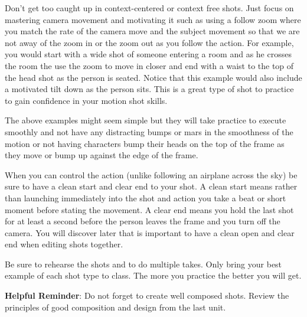 \documentclass[
]{book}
\begin{document}
\begin{assessment}
Don't get too caught up in context-centered or context free shots. Just focus on mastering camera movement and motivating it such as using a follow zoom where
you match the rate of the camera move and the subject movement so that we are not away of the zoom in or the zoom out as you follow the action. For example, you would start with a wide shot of someone entering a room and as he crosses the room the use the zoom to move in closer and end with a waist to the top of the head shot as the person is seated. Notice that this example would also
include a motivated tilt down as the person sits. This is a great type of shot to practice to gain confidence in your motion shot skills.

The above examples might seem simple but they will take practice to execute smoothly and not have any distracting bumps or mars in the smoothness of the motion or not having characters bump their heads on the top of the frame as they move or bump up against the edge of the frame.

When you can control the action (unlike following an airplane across the sky) be sure to have a clean start and clear end to your shot. A clean start means
rather than launching immediately into the shot and action you take a beat or short moment before stating the movement. A clear end means you hold the last
shot for at least a second before the person leaves the frame and you turn off the camera. You will discover later that is important to have a clean open and clear end when editing shots together.

Be sure to rehearse the shots and to do multiple takes. Only bring your best example of each shot type to class. The more you practice the better you will get.
\end{assessment}

\begin{caution}
\textbf{Helpful Reminder}: Do not forget to create well composed shots. Review the principles of good composition and design from the last unit.
\end{caution}
\end{document}

